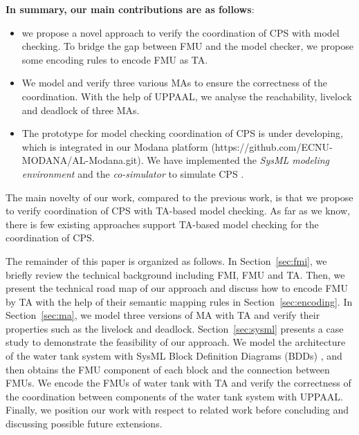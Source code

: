 \textbf{In summary, our main contributions are as follows}:
\begin{itemize}
\item
we propose a novel approach to verify the coordination of CPS with model checking. To bridge the gap between FMU and the model checker, we propose some encoding rules to encode FMU as TA.
\item
We model and verify three various MAs to ensure the correctness of the coordination. With the help of UPPAAL, we analyse the reachability, livelock and deadlock of three MAs.
\item
The prototype for model checking coordination of CPS is under developing, which is integrated in our Modana platform \cite{Cheng2015Modana}(https://github.com/ECNU-MODANA/AL-Modana.git). We have implemented the \textit{SysML modeling environment} and the \textit{co-simulator} to simulate CPS \cite{Fritzson1998Modelica}.
\end{itemize}
The main novelty of our work, compared to the previous work, is that we propose to verify coordination of CPS with TA-based model checking. As far as we know, there is few existing approaches support TA-based model checking for the coordination of CPS.

The remainder of this paper is organized as follows. In Section~\ref{sec:fmi}, we briefly review the technical background including FMI, FMU and TA. Then, we present the technical road map of our approach and discuss how to encode FMU by TA with the help of their semantic mapping rules in Section~\ref{sec:encoding}. In Section~\ref{sec:ma}, we model three versions of MA with TA and verify their properties such as the livelock and deadlock. Section~\ref{sec:sysml} presents a case study to demonstrate the feasibility of our approach. We model the architecture of the water tank system with SysML Block Definition Diagrams (BDDs) \cite{SemerathBHSV17}, and then obtains the FMU component of each block and the connection between FMUs. We encode the FMUs of water tank with TA and verify the correctness of the coordination between components of the water tank system with UPPAAL. Finally, we position our work with respect to related work before concluding and discussing possible future extensions.




















